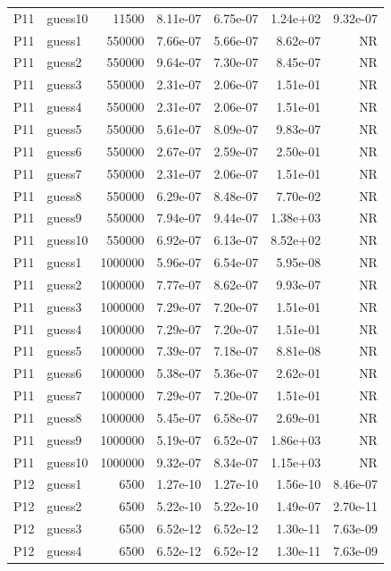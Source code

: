{\begin{longtable}{llrrrrr}
P11 & guess10 & 11500 & 8.11e-07 & 6.75e-07 & 1.24e+02 & 9.32e-07 \\
P11 & guess1 & 550000 & 7.66e-07 & 5.66e-07 & 8.62e-07 & NR \\
P11 & guess2 & 550000 & 9.64e-07 & 7.30e-07 & 8.45e-07 & NR \\
P11 & guess3 & 550000 & 2.31e-07 & 2.06e-07 & 1.51e-01 & NR \\
P11 & guess4 & 550000 & 2.31e-07 & 2.06e-07 & 1.51e-01 & NR \\
P11 & guess5 & 550000 & 5.61e-07 & 8.09e-07 & 9.83e-07 & NR \\
P11 & guess6 & 550000 & 2.67e-07 & 2.59e-07 & 2.50e-01 & NR \\
P11 & guess7 & 550000 & 2.31e-07 & 2.06e-07 & 1.51e-01 & NR \\
P11 & guess8 & 550000 & 6.29e-07 & 8.48e-07 & 7.70e-02 & NR \\
P11 & guess9 & 550000 & 7.94e-07 & 9.44e-07 & 1.38e+03 & NR \\
P11 & guess10 & 550000 & 6.92e-07 & 6.13e-07 & 8.52e+02 & NR \\
P11 & guess1 & 1000000 & 5.96e-07 & 6.54e-07 & 5.95e-08 & NR \\
P11 & guess2 & 1000000 & 7.77e-07 & 8.62e-07 & 9.93e-07 & NR \\
P11 & guess3 & 1000000 & 7.29e-07 & 7.20e-07 & 1.51e-01 & NR \\
P11 & guess4 & 1000000 & 7.29e-07 & 7.20e-07 & 1.51e-01 & NR \\
P11 & guess5 & 1000000 & 7.39e-07 & 7.18e-07 & 8.81e-08 & NR \\
P11 & guess6 & 1000000 & 5.38e-07 & 5.36e-07 & 2.62e-01 & NR \\
P11 & guess7 & 1000000 & 7.29e-07 & 7.20e-07 & 1.51e-01 & NR \\
P11 & guess8 & 1000000 & 5.45e-07 & 6.58e-07 & 2.69e-01 & NR \\
P11 & guess9 & 1000000 & 5.19e-07 & 6.52e-07 & 1.86e+03 & NR \\
P11 & guess10 & 1000000 & 9.32e-07 & 8.34e-07 & 1.15e+03 & NR \\
P12 & guess1 & 6500 & 1.27e-10 & 1.27e-10 & 1.56e-10 & 8.46e-07 \\
P12 & guess2 & 6500 & 5.22e-10 & 5.22e-10 & 1.49e-07 & 2.70e-11 \\
P12 & guess3 & 6500 & 6.52e-12 & 6.52e-12 & 1.30e-11 & 7.63e-09 \\
P12 & guess4 & 6500 & 6.52e-12 & 6.52e-12 & 1.30e-11 & 7.63e-09 \\

\end{longtable}}

